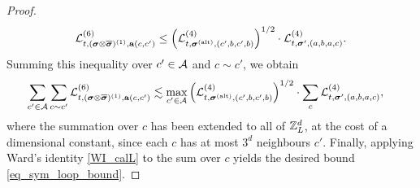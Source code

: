 \begin{proof}
\begin{align}\label{eq_sym_loop_bound_old}
 \mathcal{L}^{(6)}_{t, (\bsig\otimes \overline\bsig)^{(1)}, \ba(c,c')} \le \left(\mathcal{L}^{(4)}_{t,\bsig^{(\alt)}, (c',b,c',b)}\right)^{1/2} \cdot \mathcal{L}^{(4)}_{t, \bsig', (a,b,a,c)} .
\end{align}
Summing this inequality over $c'\in \cal A$ and $c\sim c'$, we obtain 
\begin{align*}
\sum_{c'\in \cal A}\sum_{c\sim c'} \mathcal{L}^{(6)}_{t, (\bsig\otimes \overline\bsig)^{(1)}, \ba(c,c')} &\lesssim \max_{c'\in \cal A}\left(\mathcal{L}^{(4)}_{t,\bsig^{(\alt)}, (c',b,c',b)}\right)^{1/2}\cdot \sum_{c}\mathcal{L}^{(4)}_{t, \bsig', (a,b,a,c)} ,
\end{align*}
where the summation over $c$ has been extended to all of $\Zn$, at the cost of a dimensional constant, since each $c$ has at most $3^d$ neighbours $c'$. Finally, applying Ward's identity \eqref{WI_calL} to the sum over $c$ yields the desired bound \eqref{eq_sym_loop_bound}. 
\end{proof}



